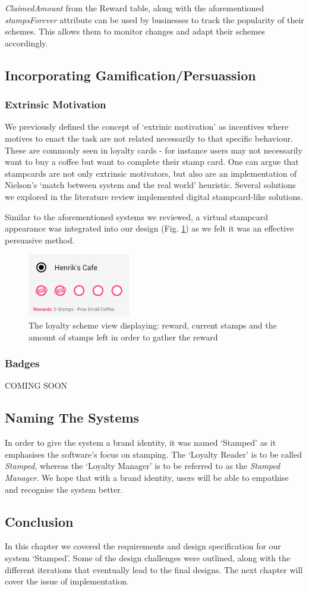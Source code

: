 \emph{ClaimedAmount} from the Reward table, along with the aforementioned \emph{stampsForever} attribute can be used by businesses to track the popularity of their schemes. This allows them to monitor changes and adapt their schemes accordingly.

\newpage
\subsection{Incorporating Gamification/Persuassion}
\subsubsection{Extrinsic Motivation}
We previously defined the concept of `extrinic motivation' as incentives where motives to enact the task are not related necessarily to that specific behaviour. These are commonly seen in loyalty cards - for instance users may not necessarily want to buy a coffee but want to complete their stamp card. One can argue that stampcards are not only extrinsic motivators, but also are an implementation of Nielson's `match between system and the real world' heuristic. Several solutions we explored in the literature review implemented digital stampcard-like solutions.

Similar to the aforementioned systems we reviewed, a virtual stampcard appearance was integrated into our design (Fig. \ref{fig:extrinsicmotivation}) as we felt it was an effective persuasive method. 
\begin{figure}[H]
 \centering
  \includegraphics[width=0.40\textwidth]{img/stampcardprogress.jpg}
     \caption{The loyalty scheme view displaying: reward, current stamps and the amount of stamps left in order to gather the reward}
     \label{fig:extrinsicmotivation}
\end{figure}
\subsubsection{Badges}
COMING SOON
\subsection{Naming The Systems}
In order to give the system a brand identity, it was named `Stamped' as it emphasises the software's focus on stamping. The `Loyalty Reader' is to be called \emph{Stamped}, whereas the `Loyalty Manager' is to be referred to as the \emph{Stamped Manager}. We hope that with a brand identity, users will be able to empathise and recognise the system better.
\subsection{Conclusion}
In this chapter we covered the requirements and design specification for our system `Stamped'. Some of the design challenges were outlined, along with the different iterations that eventually lead to the final designs. The next chapter will cover the issue of implementation.